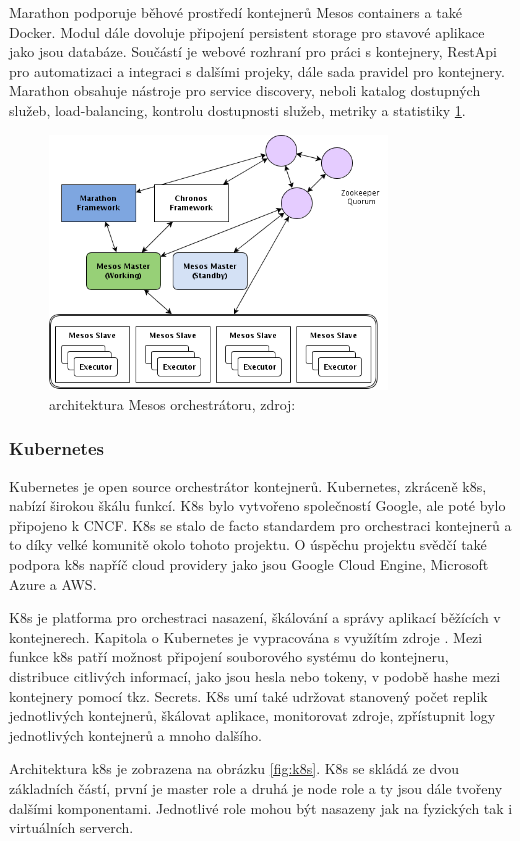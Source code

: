 	Marathon podporuje běhové prostředí kontejnerů Mesos containers a také Docker. Modul dále dovoluje připojení persistent storage pro stavové aplikace jako jsou \linebreak databáze. Součástí je webové rozhraní pro práci s kontejnery, RestApi pro automatizaci a integraci s dalšími projeky, dále sada pravidel pro kontejnery. Marathon obsahuje nástroje pro service discovery, neboli katalog dostupných služeb, load-balancing, kontrolu dostupnosti služeb, metriky a statistiky \ref{fig:mesos}.


\begin{figure}[H]
  \begin{centering}
	  \includegraphics[width=0.8\textwidth]{images/mesos.png}
    \par
	  \caption{architektura Mesos orchestrátoru\label{fig:mesos}, zdroj:}
    \end{centering}
\end{figure}

\subsubsection{Kubernetes}
Kubernetes je open source orchestrátor kontejnerů. Kubernetes, zkráceně k8s, nabízí širokou škálu funkcí. K8s bylo vytvořeno společností Google, ale poté bylo připojeno k CNCF. K8s se stalo de facto standardem pro orchestraci kontejnerů a to díky velké komunitě okolo tohoto projektu. O úspěchu projektu svědčí také podpora k8s napříč cloud providery jako jsou Google Cloud Engine, Microsoft Azure a AWS. \par
K8s je platforma pro orchestraci nasazení, škálování a správy aplikací běžících v kontejnerech. Kapitola o Kubernetes je vypracována s využítím zdroje \cite{MASTERING-KUBERNETES}. Mezi funkce k8s patří možnost připojení souborového systému do kontejneru, distribuce citlivých informací, jako jsou hesla nebo tokeny, v podobě hashe mezi kontejnery pomocí tkz. Secrets. K8s umí také udržovat stanovený počet replik jednotlivých kontejnerů, škálovat aplikace, monitorovat zdroje, zpřístupnit logy jednotlivých kontejnerů a mnoho dalšího. \par
Architektura k8s je zobrazena na obrázku \ref{fig:k8s}. K8s se skládá ze dvou základních částí, první je master role a druhá je node role a ty jsou dále tvořeny dalšími komponentami. Jednotlivé role mohou být nasazeny jak na fyzických tak i virtuálních serverch. \par

